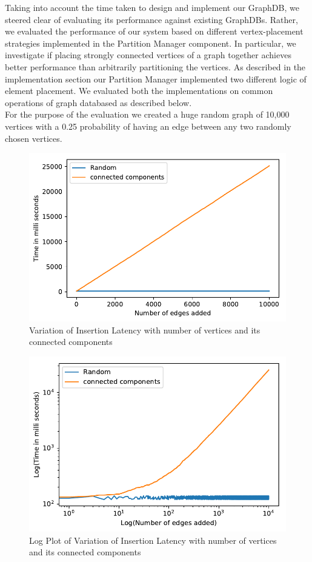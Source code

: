 \documentclass[letterpaper, 11 pt, conference]{ieeeconf}  %
\begin{document}
Taking into account the time taken to design and implement our GraphDB, we steered clear of evaluating its performance against existing GraphDBs. Rather, we evaluated the performance of our system based on different vertex-placement strategies implemented in the Partition Manager component. In particular, we investigate if placing strongly connected vertices of a graph together achieves better performance than arbitrarily partitioning the vertices. As described in the implementation section our Partition Manager implemented two different logic of element placement. We evaluated both the implementations on common operations of graph databased as described below. \\

For the purpose of the evaluation we created a huge random graph of 10,000 vertices with a 0.25 probability of having an edge between any two randomly chosen vertices.\\


\begin{figure}
  \includegraphics[width=\linewidth]{plot4.pdf}
  \caption{Variation of Insertion Latency with number of vertices and its connected components}
  \label{fig:plot4}
\end{figure}

\begin{figure}
  \includegraphics[width=\linewidth]{plot3.pdf}
  \caption{Log Plot of Variation of Insertion Latency with number of vertices and its connected components}
  \label{fig:plot3}
\end{figure}
\end{document}
